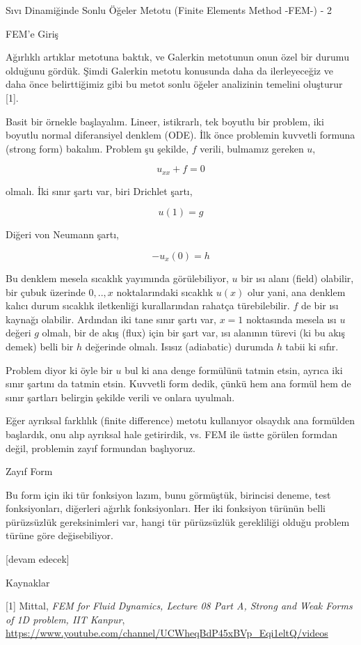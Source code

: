 \documentclass[12pt,fleqn]{article}\usepackage{../../common}
\begin{document}
Sıvı Dinamiğinde Sonlu Öğeler Metotu (Finite Elements Method -FEM-) - 2

FEM'e Giriş

Ağırlıklı artıklar metotuna baktık, ve Galerkin metotunun onun özel bir durumu
olduğunu gördük. Şimdi Galerkin metotu konusunda daha da ilerleyeceğiz ve daha
önce belirttiğimiz gibi bu metot sonlu öğeler analizinin temelini oluşturur [1].

Basit bir örnekle başlayalım. Lineer, istikrarlı, tek boyutlu bir problem, iki
boyutlu normal diferansiyel denklem (ODE). İlk önce problemin kuvvetli formuna
(strong form) bakalım. Problem şu şekilde, $f$ verili, bulmamız gereken $u$,

$$
u_{xx} + f = 0
$$

olmalı. İki sınır şartı var, biri Drichlet şartı,

$$
u(1) = g
$$

Diğeri von Neumann şartı,

$$
-u_{x}(0) = h
$$

Bu denklem mesela sıcaklık yayımında görülebiliyor, $u$ bir ısı alanı (field)
olabilir, bir çubuk üzerinde $0,..,x$ noktalarındaki sıcaklık $u(x)$ olur yani,
ana denklem kalıcı durum sıcaklık iletkenliği kurallarından rahatça
türebilebilir. $f$ de bir ısı kaynağı olabilir. Ardından iki tane sınır şartı
var, $x=1$ noktasında mesela ısı $u$ değeri $g$ olmalı, bir de akış (flux) için
bir şart var, ısı alanının türevi (ki bu akış demek) belli bir $h$ değerinde
olmalı. Isısız (adiabatic) durumda $h$ tabii ki sıfır.

Problem diyor ki öyle bir $u$ bul ki ana denge formülünü tatmin etsin, ayrıca
iki sınır şartını da tatmin etsin. Kuvvetli form dedik, çünkü hem ana formül hem
de sınır şartları belirgin şekilde verili ve onlara uyulmalı.

Eğer ayrıksal farklılık (finite difference) metotu kullanıyor olsaydık ana
formülden başlardık, onu alıp ayrıksal hale getirirdik, vs. FEM ile üstte
görülen formdan değil, problemin zayıf formundan başlıyoruz.

Zayıf Form

Bu form için iki tür fonksiyon lazım, bunu görmüştük, birincisi deneme, test
fonksiyonları, diğerleri ağırlık fonksiyonları. Her iki fonksiyon türünün belli
pürüzsüzlük gereksinimleri var, hangi tür pürüzsüzlük gerekliliği olduğu
problem türüne göre değisebiliyor.



[devam edecek]

Kaynaklar

[1] Mittal, {\em FEM for Fluid Dynamics, Lecture 08 Part A, Strong and Weak Forms of 1D problem, IIT Kanpur},
    \url{https://www.youtube.com/channel/UCWheqBdP45xBVp_Eqi1eltQ/videos}
\end{document}

